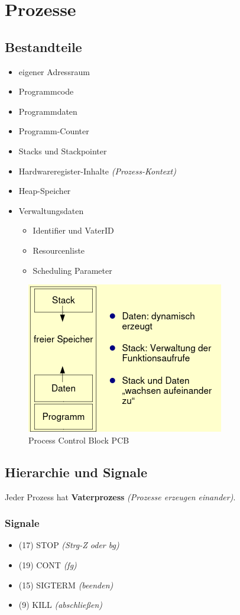 \section{Prozesse}

\subsection{Bestandteile}
\begin{itemize}
    \item eigener Adressraum
    \item Programmcode
    \item Programmdaten
    \item Programm-Counter
    \item Stacks und Stackpointer
    \item Hardwareregister-Inhalte \textit{(Prozess-Kontext)}
    \item Heap-Speicher
    \item Verwaltungsdaten
    \begin{itemize}
        \item Identifier und VaterID
        \item Resourcenliste
        \item Scheduling Parameter
    \end{itemize}
\end{itemize}

\begin{figure}[ht!]
    \includegraphics[scale=.75]{pics/processes}
    \caption{Process Control Block PCB}
\end{figure}

\subsection{Hierarchie und Signale}
Jeder Prozess hat \textbf{Vaterprozess} \textit{(Prozesse erzeugen einander)}.

\subsubsection{Signale}
\begin{itemize}
    \item (17) STOP \textit{(Strg-Z oder bg)}
    \item (19) CONT \textit{(fg)}
    \item (15) SIGTERM \textit{(beenden)}
    \item (9) KILL \textit{(abschließen)}
\end{itemize}